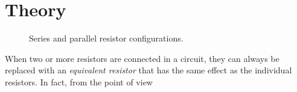 \documentclass[12pt]{article}
\begin{document}
\section{Theory}
\label{sec:theory}

\begin{figure}
  \centering
     \qquad
  \caption{Series and parallel resistor configurations.}
  \label{fig:combinations}
\end{figure}
When two or more resistors are connected in a circuit, they can always
be replaced with an \textit{equivalent resistor} that has the same
effect as the individual resistors.  In fact, from the point of view
\end{document}
